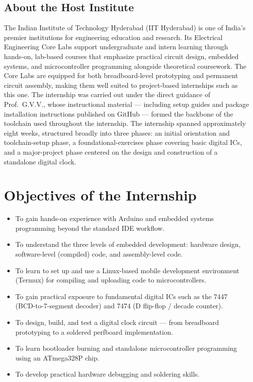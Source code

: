\documentclass[12pt,a4paper]{report}
\begin{document}
\section{About the Host Institute}
\label{sec:host}
The Indian Institute of Technology Hyderabad (IIT Hyderabad) is one of India's premier institutions for engineering education and research. Its Electrical Engineering Core Labs support undergraduate and intern learning through hands-on, lab-based courses that emphasize practical circuit design, embedded systems, and microcontroller programming alongside theoretical coursework. The Core Labs are equipped for both breadboard-level prototyping and permanent circuit assembly, making them well suited to project-based internships such as this one.
The internship was carried out under the direct guidance of Prof.\ G.V.V., whose instructional material --- including setup guides and package installation instructions published on GitHub --- formed the backbone of the toolchain used throughout the internship.
The internship spanned approximately eight weeks, structured broadly into three phases: an initial orientation and toolchain-setup phase, a foundational-exercises phase covering basic digital ICs, and a major-project phase centered on the design and construction of a standalone digital clock.
\chapter{Objectives of the Internship}
\label{ch:objectives}
\begin{itemize}
    \item To gain hands-on experience with Arduino and embedded systems programming beyond the standard IDE workflow.
    \item To understand the three levels of embedded development: hardware design, software-level (compiled) code, and assembly-level code.
    \item To learn to set up and use a Linux-based mobile development environment (Termux) for compiling and uploading code to microcontrollers.
    \item To gain practical exposure to fundamental digital ICs such as the 7447 (BCD-to-7-segment decoder) and 7474 (D flip-flop / decade counter).
    \item To design, build, and test a digital clock circuit --- from breadboard prototyping to a soldered perfboard implementation.
    \item To learn bootloader burning and standalone microcontroller programming using an ATmega328P chip.
    \item To develop practical hardware debugging and soldering skills.
\end{itemize}
\end{document}
